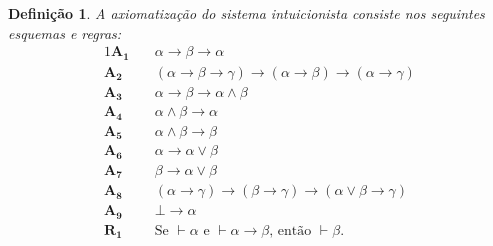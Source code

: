 \documentclass{report}
\newtheorem{definition}{Definição}
\begin{document}
    \begin{definition}
        A axiomatização do sistema intuicionista consiste nos seguintes esquemas e regras:
        \begin{alignat*}{1}
            \mathbf{A_1}\quad & \alpha\to\beta\to\alpha \\
            \mathbf{A_2}\quad & (\alpha\to\beta\to\gamma)\to(\alpha\to\beta)\to(\alpha\to\gamma) \\
            \mathbf{A_3}\quad & \alpha\to\beta\to\alpha\wedge\beta \\
            \mathbf{A_4}\quad & \alpha\wedge\beta\to\alpha \\
            \mathbf{A_5}\quad & \alpha\wedge\beta\to\beta \\
            \mathbf{A_6}\quad & \alpha\to\alpha\vee\beta \\
            \mathbf{A_7}\quad & \beta\to\alpha\vee\beta \\
            \mathbf{A_8}\quad & (\alpha\to\gamma)\to(\beta\to\gamma)\to(\alpha\vee\beta\to\gamma) \\
            \mathbf{A_9}\quad & \bot\to\alpha \\
            \mathbf{R_1}\quad & \text{Se }\vdash\alpha\text{ e }\vdash\alpha\to\beta\text{, então }\vdash\beta\text{.}
            \tag*{\qed}
        \end{alignat*}   
    \end{definition}
\end{document}
